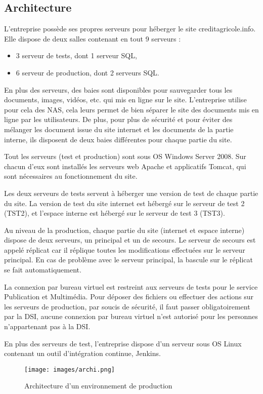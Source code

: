 \documentclass[12pt,a4paper]{article}
\begin{document}
\subsection{Architecture}
L'entreprise possède ses propres serveurs pour héberger le site creditagricole.info. Elle dispose de deux salles contenant en tout 9 serveurs :
\begin{itemize}
\item 3 serveur de tests, dont 1 serveur SQL,
\item 6 serveur de production, dont 2 serveurs SQL.
\end{itemize}
En plus des serveurs, des baies sont disponibles pour sauvegarder tous les documents, images, vidéos, etc. qui mis en ligne sur le site. L'entreprise utilise pour cela des NAS, cela leurs permet de bien séparer le site des documents mis en ligne par les utilisateurs. De plus, pour plus de sécurité et pour éviter des mélanger les document issue du site internet et les documents de la partie interne, ils disposent de deux baies différentes pour chaque partie du site.\par
\medskip
Tout les serveurs (test et production) sont sous OS Windows Server 2008. Sur chacun d'eux sont installés les serveurs web Apache et applicatifs Tomcat, qui sont nécessaires au fonctionnement du site.\par
Les deux serveurs de tests servent à héberger une version de test de chaque partie du site. La version de test du site internet est hébergé sur le serveur de test 2 (TST2), et l'espace interne est hébergé sur le serveur de test 3 (TST3).\par
Au niveau de la production, chaque partie du site (internet et espace interne) dispose de deux serveurs, un principal et un de secours. Le serveur de secours est appelé réplicat car il réplique toutes les modifications effectuées sur le serveur principal. En cas de problème avec le serveur principal, la bascule sur le réplicat se fait automatiquement.\par
La connexion par bureau virtuel est restreint aux serveurs de tests pour le service Publication et Multimédia. Pour déposer des fichiers ou effectuer des actions sur les serveurs de production, par soucis de sécurité, il faut passer obligatoirement par la DSI, aucune connexion par bureau virtuel n'est autorisé pour les personnes n'appartenant pas à la DSI.\par
\medskip
En plus des serveurs de test, l'entreprise dispose d'un serveur sous OS Linux contenant un outil d'intégration continue, Jenkins. 
\begin{figure}[h!]
\centering
\texttt{[image: images/archi.png]} 
\caption{Architecture d'un environnement de production}
\end{figure}
\newpage
\end{document}
